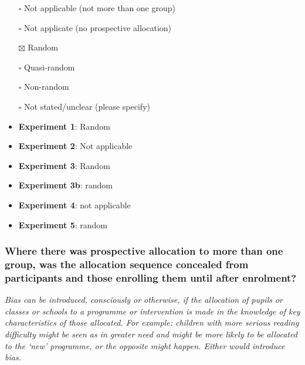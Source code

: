 \documentclass[
  doc, a4paper]{apa7}
\begin{document}
\begin{itemize}
\item[$\square$]
  Not applicable (not more than one group)\\
\item[$\square$]
  Not applicate (no prospective allocation)\\
\item[$\boxtimes$]
  Random\\
\item[$\square$]
  Quasi-random\\
\item[$\square$]
  Non-random\\
\item[$\square$]
  Not stated/unclear (please specify)
\item
  \textbf{Experiment 1}: Random\\
\item
  \textbf{Experiment 2}: Not applicable
\item
  \textbf{Experiment 3}: Random
\item
  \textbf{Experiment 3b}: random
\item
  \textbf{Experiment 4}: not applicable
\item
  \textbf{Experiment 5}: random
\end{itemize}

\subsubsection{Where there was prospective allocation to more than one group, was the allocation sequence concealed from participants and those enrolling them until after enrolment?}\label{where-there-was-prospective-allocation-to-more-than-one-group-was-the-allocation-sequence-concealed-from-participants-and-those-enrolling-them-until-after-enrolment}

\emph{Bias can be introduced, consciously or otherwise, if the allocation of pupils or classes or schools to a programme or intervention is made in the knowledge of key characteristics of those allocated. For example: children with more serious reading difficulty might be seen as in greater need and might be more likely to be allocated to the `new' programme, or the opposite might happen. Either would introduce bias.}
\end{document}
